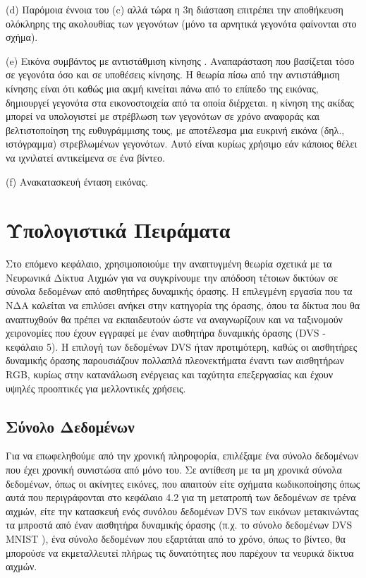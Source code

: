 \documentclass[12pt]{report}
\begin{document}
(\textlatin{d}) Παρόμοια έννοια του (\textlatin{c}) αλλά τώρα η 3η διάσταση επιτρέπει την αποθήκευση ολόκληρης της ακολουθίας των γεγονότων (μόνο τα αρνητικά γεγονότα φαίνονται στο σχήμα).

(\textlatin{e}) Εικόνα συμβάντος με αντιστάθμιση κίνησης \cite{Gallego2020}. Αναπαράσταση που βασίζεται τόσο σε γεγονότα όσο και σε υποθέσεις κίνησης. Η θεωρία πίσω από την αντιστάθμιση κίνησης είναι ότι καθώς μια ακμή κινείται πάνω από το επίπεδο της εικόνας, δημιουργεί γεγονότα στα εικονοστοιχεία από τα οποία διέρχεται. η κίνηση της ακίδας μπορεί να υπολογιστεί με στρέβλωση των γεγονότων σε χρόνο αναφοράς και βελτιστοποίηση της ευθυγράμμισης τους, με αποτέλεσμα μια ευκρινή εικόνα (δηλ., ιστόγραμμα) στρεβλωμένων γεγονότων. Αυτό είναι κυρίως χρήσιμο εάν κάποιος θέλει να ιχνιλατεί αντικείμενα σε ένα βίντεο.

(\textlatin{f}) Ανακατασκευή ένταση εικόνας\cite{rebecq2019}.


\chapter{Υπολογιστικά Πειράματα}

Στο επόμενο κεφάλαιο, χρησιμοποιούμε την αναπτυγμένη θεωρία σχετικά με τα Νευρωνικά Δίκτυα Αιχμών για να συγκρίνουμε την απόδοση τέτοιων δικτύων σε σύνολα δεδομένων από αισθητήρες δυναμικής όρασης. Η επιλεγμένη εργασία που τα ΝΔΑ καλείται να επιλύσει ανήκει στην κατηγορία της όρασης, όπου τα δίκτυα που θα αναπτυχθούν θα πρέπει να εκπαιδευτούν ώστε να αναγνωρίζουν και να ταξινομούν χειρονομίες που έχουν εγγραφεί με έναν αισθητήρα δυναμικής όρασης (\textlatin{DVS} - κεφάλαιο 5). Η επιλογή των δεδομένων \textlatin{DVS} ήταν προτιμότερη, καθώς οι αισθητήρες δυναμικής όρασης παρουσιάζουν πολλαπλά πλεονεκτήματα έναντι των αισθητήρων \textlatin{RGB}, κυρίως στην κατανάλωση ενέργειας και ταχύτητα επεξεργασίας και έχουν υψηλές προοπτικές για μελλοντικές χρήσεις.

\section{Σύνολο Δεδομένων}

Για να επωφεληθούμε από την χρονική πληροφορία, επιλέξαμε ένα σύνολο δεδομένων που έχει χρονική συνιστώσα από μόνο του. Σε αντίθεση με τα μη χρονικά σύνολα δεδομένων, όπως οι ακίνητες εικόνες, που απαιτούν είτε σχήματα κωδικοποίησης όπως αυτά που περιγράφονται στο κεφάλαιο 4.2 για τη μετατροπή των δεδομένων σε τρένα αιχμών, είτε την κατασκευή ενός συνόλου δεδομένων \textlatin{DVS} των εικόνων μετακινώντας τα μπροστά από έναν αισθητήρα δυναμικής όρασης (π.χ. το σύνολο δεδομένων \textlatin{DVS MNIST} \cite{Gotarredona2015}), ένα σύνολο δεδομένων που εξαρτάται από το χρόνο, όπως το βίντεο, θα μπορούσε να εκμεταλλευτεί πλήρως τις δυνατότητες που παρέχουν τα νευρικά δίκτυα αιχμών.
\end{document}
